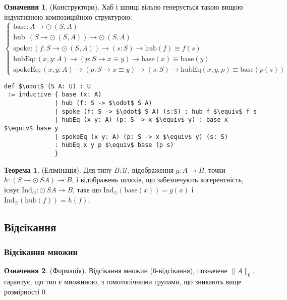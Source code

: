 \documentclass{article}
\theoremstyle{definition}
\newtheorem{theorem}{Теорема}
\newtheorem{definition}{Означення}
\begin{document}
\begin{definition} (Конструктори).
Хаб і шпиці вільно генерується такою вищою індуктивною композиційною структурою:
\[
\begin{cases}
\text{base} : A \to \odot\ (S,A) \\
\text{hub} : (S \to \odot\ (S,A)) \to \odot\ (S,A) \\
\text{spoke} : (f : S \to \odot\ (S,A)) \to (s : S) \to \text{hub}(f) \equiv f(s) \\
\text{hubEq} : (x, y : A) \to (p : S \to x \equiv y) \to \text{base}(x) \equiv \text{base}(y) \\
\text{spokeEq} : (x, y : A) \to (p : S \to x \equiv y) \to (s : S) \to \text{hubEq}(x,y,p) \equiv \text{base}(p(s))
\end{cases}
\]
\begin{lstlisting}[mathescape=true]
def $\odot$ (S A: U) : U
 := inductive { base (x: A)
              | hub (f: S -> $\odot$ S A)
              | spoke (f: S -> $\odot$ S A) (s:S) : hub f $\equiv$ f s
              | hubEq (x y: A) (p: S -> x $\equiv$ y) : base x $\equiv$ base y
              | spokeEq (x y: A) (p: S -> x $\equiv$ y) (s: S)
              : hubEq x y p $\equiv$ base (p s)
              }
\end{lstlisting}
\end{definition}

\begin{theorem} (Елімінація).
Для типу \( B : \mathcal{U} \), відображення \( g : A \to B \),
точки \( h : (S \to \odot\ S A) \to B \), і відображень шляхів,
що забезпечують когерентність, існує
\( \text{Ind}_{\odot} : \odot\ S A \to B \),
таке що \( \text{Ind}_\odot(\text{base}(x)) = g(x) \)
і \( \text{Ind}_\odot(\text{hub}(f)) = h(f) \).
\end{theorem}

\newpage
\subsection{Відсікання}
\subsubsection*{Відсікання множин}
\begin{definition} (Формація).
Відсікання множин (0-відсікання), позначене \( \| A \|_0 \),
гарантує, що тип є множиною, з гомотопічними групами, що зникають вище розмірності 0.
\end{definition}
\end{document}
